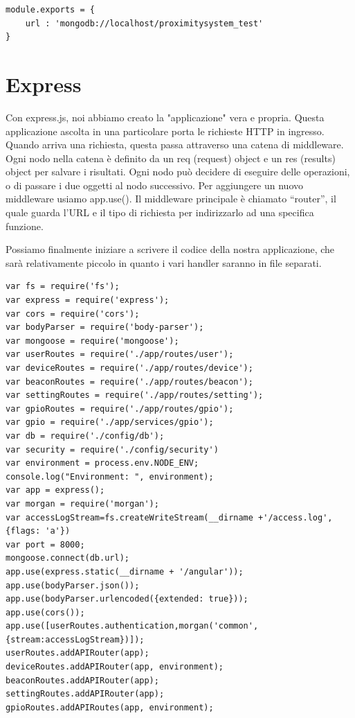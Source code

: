 \begin{lstlisting}[caption={config/db.js}, style=javaScriptCode]
module.exports = {
 	url : 'mongodb://localhost/proximitysystem_test'
}
\end{lstlisting}

\section{Express}
Con express.js, noi abbiamo creato la "applicazione" vera e propria. 
Questa applicazione ascolta in una particolare porta le richieste HTTP in ingresso.
Quando arriva una richiesta, questa passa attraverso una catena di middleware.
Ogni nodo nella catena è definito da un req (request) object e un res (results) object per salvare i risultati. 
Ogni nodo può decidere di eseguire delle operazioni, o di passare i due oggetti al nodo successivo. 
Per aggiungere un nuovo middleware usiamo app.use(). 
Il middleware principale è chiamato “router”, il quale guarda l’URL e il tipo di richiesta per indirizzarlo ad una specifica funzione.

Possiamo finalmente iniziare a scrivere il codice della nostra applicazione, 
che sarà relativamente piccolo in quanto i vari handler saranno in file separati.
\begin{lstlisting}[caption={server.js}, style=javaScriptCode]
var fs = require('fs');
var express = require('express');
var cors = require('cors');
var bodyParser = require('body-parser');
var mongoose = require('mongoose');
var userRoutes = require('./app/routes/user');
var deviceRoutes = require('./app/routes/device');
var beaconRoutes = require('./app/routes/beacon');
var settingRoutes = require('./app/routes/setting');
var gpioRoutes = require('./app/routes/gpio');
var gpio = require('./app/services/gpio');
var db = require('./config/db');
var security = require('./config/security')
var environment = process.env.NODE_ENV;
console.log("Environment: ", environment);
var app = express();
var morgan = require('morgan');
var accessLogStream=fs.createWriteStream(__dirname +'/access.log', {flags: 'a'})
var port = 8000;
mongoose.connect(db.url);
app.use(express.static(__dirname + '/angular'));
app.use(bodyParser.json());
app.use(bodyParser.urlencoded({extended: true}));
app.use(cors());
app.use([userRoutes.authentication,morgan('common',{stream:accessLogStream})]);
userRoutes.addAPIRouter(app);
deviceRoutes.addAPIRouter(app, environment);
beaconRoutes.addAPIRouter(app);
settingRoutes.addAPIRouter(app);
gpioRoutes.addAPIRoutes(app, environment);
\end{lstlisting}

